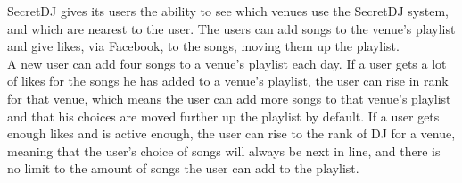 SecretDJ gives its users the ability to see which venues use the SecretDJ system, and which are nearest to the user. The users can add songs to the venue's playlist and give likes, via Facebook, to the songs, moving them up the playlist.\\

A new user can add four songs to a venue's playlist each day. If a user gets a lot of likes for the songs he has added to a venue's playlist, the user can rise in rank for that venue, which means the user can add more songs to that venue's playlist and that his choices are moved further up the playlist by default. 
If a user gets enough likes and is active enough, the user can rise to the rank of DJ for a venue, meaning that the user's choice of songs will always be next in line, and there is no limit to the amount of songs the user can add to the playlist.
